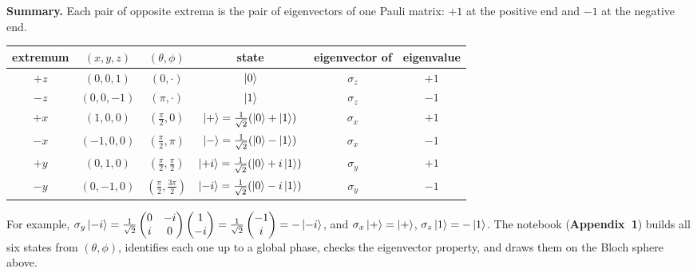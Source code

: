 \documentclass[a4paper, 10pt]{article}
\begin{document}
\begin{solution}
	\noindent \textbf{Summary.} Each pair of opposite extrema is the pair of eigenvectors of one Pauli matrix: \( +1 \) at the positive end and \( -1 \) at the negative end.
	\begin{center}
		\renewcommand{\arraystretch}{1.25}
		\begin{tabular}{cccccc}
			\toprule
			extremum & \( (x, y, z) \) & \( (\theta, \phi) \)                  & state                                                     & eigenvector of & eigenvalue \\
			\midrule
			\( +z \) & \( (0, 0, 1) \)  & \( (0, \cdot) \)                      & \( \ket{0} \)                                             & \( \sigma_z \) & \( +1 \)   \\
			\( -z \) & \( (0, 0, -1) \) & \( (\pi, \cdot) \)                    & \( \ket{1} \)                                             & \( \sigma_z \) & \( -1 \)   \\
			\( +x \) & \( (1, 0, 0) \)  & \( (\tfrac{\pi}{2}, 0) \)             & \( \ket{+} = \tfrac{1}{\sqrt{2}}(\ket{0} + \ket{1}) \)   & \( \sigma_x \) & \( +1 \)   \\
			\( -x \) & \( (-1, 0, 0) \) & \( (\tfrac{\pi}{2}, \pi) \)           & \( \ket{-} = \tfrac{1}{\sqrt{2}}(\ket{0} - \ket{1}) \)   & \( \sigma_x \) & \( -1 \)   \\
			\( +y \) & \( (0, 1, 0) \)  & \( (\tfrac{\pi}{2}, \tfrac{\pi}{2}) \) & \( \ket{{+i}} = \tfrac{1}{\sqrt{2}}(\ket{0} + i\ket{1}) \) & \( \sigma_y \) & \( +1 \)   \\
			\( -y \) & \( (0, -1, 0) \) & \( (\tfrac{\pi}{2}, \tfrac{3\pi}{2}) \) & \( \ket{{-i}} = \tfrac{1}{\sqrt{2}}(\ket{0} - i\ket{1}) \) & \( \sigma_y \) & \( -1 \)   \\
			\bottomrule
		\end{tabular}
	\end{center}
	For example, \( \sigma_y\ket{{-i}} = \tfrac{1}{\sqrt{2}}\begin{pmatrix} 0 & -i \\ i & 0 \end{pmatrix}\begin{pmatrix} 1 \\ -i \end{pmatrix} = \tfrac{1}{\sqrt{2}}\begin{pmatrix} -1 \\ i \end{pmatrix} = -\ket{{-i}} \), and \( \sigma_x\ket{+} = \ket{+} \), \( \sigma_z\ket{1} = -\ket{1} \).
	\noindent The notebook (\textbf{Appendix~1}) builds all six states from \( (\theta, \phi) \), identifies each one up to a global phase, checks the eigenvector property, and draws them on the Bloch sphere above.
\end{solution}
\end{document}
